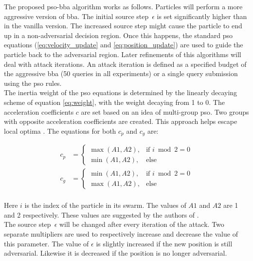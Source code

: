 The proposed \gls{pso}-\gls{bba} algorithm works as follows. Particles will perform a more aggressive version of \gls{bba}. The initial source step~$\epsilon$ is set significantly higher than in the vanilla version. The increased source step might cause the particle to end up in a non-adversarial decision region. Once this happens, the standard \gls{pso} equations (\ref{eq:velocity_update} and \ref{eq:position_update}) are used to guide the particle back to the adversarial region. Later refinements of this algorithms will deal with attack iterations. An attack iteration is defined as a specified budget of the aggressive \gls{bba} (50 queries in all experiments) or a single query submission using the \gls{pso} rules.\\

The inertia weight of the \gls{pso} equations is determined by the linearly decaying scheme of equation \ref{eq:weight}, with the weight decaying from 1 to 0. The acceleration coefficients $c$ are set based on an idea of multi-group \gls{pso}. Two groups with opposite acceleration coefficients are created. This approach helps escape local optima \cite{opposite_cs}. The equations for both $c_p$ and $c_g$ are:

\begin{align*}
c_p &= 
\begin{cases}
	\max(A1, A2), &\text{if } i\bmod 2 = 0\\
	\min(A1, A2), &\text{else}
\end{cases}\\
c_g &=
\begin{cases}
	\min(A1, A2), &\text{if } i\bmod 2 = 0\\
	\max(A1, A2), &\text{else}
\end{cases}\\
\end{align*} 

Here $i$ is the index of the particle in its swarm. The values of $A1$ and $A2$ are 1 and 2 respectively. These values are suggested by the authors of \cite{suryanto2020}.\\

The source step~$\epsilon$ will be changed after every iteration of the attack. Two separate multipliers are used to respectively increase and decrease the value of this parameter. The value of $\epsilon$ is slightly increased if the new position is still adversarial. Likewise it is decreased if the position is no longer adversarial.\\

